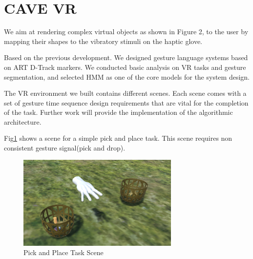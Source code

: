 \section{CAVE VR}

We aim at rendering complex virtual objects as shown in Figure 2, to
the user by mapping their shapes to the vibratory stimuli on the
haptic glove.

Based on the previous development. We designed gesture language
systems based on ART D-Track markers. %
We conducted basic analysis on VR tasks and gesture segmentation, and
selected HMM as one of the core models for the system
design. 


The VR environment we built contains different
scenes. Each scene comes with  a set of gesture time sequence design
requirements that are vital for the completion of the task. Further
work will provide the implementation of the algorithmic architecture.  

Fig\ref{fig:pickplace} shows a scene for a simple pick and
place task. This scene requires non consistent gesture signal(pick and
drop). 

\begin{figure}[!ht]
  \centering
  \includegraphics[width=8cm]{figures/pickplace.png}
  \caption{Pick and Place Task Scene}
  \label{fig:pickplace}
\end{figure}

